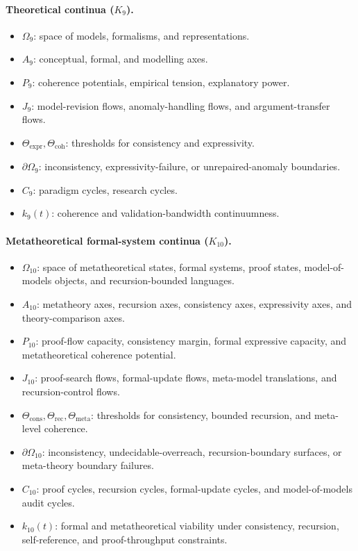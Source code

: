 \paragraph{Theoretical continua (\texorpdfstring{\(K_9\)}{K9}).}
\begin{itemize}
  \item \(\Omega_9\): space of models, formalisms, and representations.
  \item \(A_9\): conceptual, formal, and modelling axes.
  \item \(P_9\): coherence potentials, empirical tension, explanatory power.
  \item \(J_9\): model-revision flows, anomaly-handling flows, and
        argument-transfer flows.
  \item \(\Theta_{\mathrm{expr}}, \Theta_{\mathrm{coh}}\): thresholds for
        consistency and expressivity.
  \item \(\partial\Omega_9\): inconsistency, expressivity-failure, or
        unrepaired-anomaly boundaries.
  \item \(C_9\): paradigm cycles, research cycles.
  \item \(k_9(t)\): coherence and validation-bandwidth continuumness.
\end{itemize}

\paragraph{Metatheoretical formal-system continua (\texorpdfstring{\(K_{10}\)}{K10}).}
\begin{itemize}
  \item \(\Omega_{10}\): space of metatheoretical states, formal systems,
        proof states, model-of-models objects, and recursion-bounded
        languages.
  \item \(A_{10}\): metatheory axes, recursion axes, consistency axes,
        expressivity axes, and theory-comparison axes.
  \item \(P_{10}\): proof-flow capacity, consistency margin, formal
        expressive capacity, and metatheoretical coherence potential.
  \item \(J_{10}\): proof-search flows, formal-update flows,
        meta-model translations, and recursion-control flows.
  \item \(\Theta_{\mathrm{cons}}, \Theta_{\mathrm{rec}}, \Theta_{\mathrm{meta}}\):
        thresholds for consistency, bounded recursion, and meta-level
        coherence.
  \item \(\partial\Omega_{10}\): inconsistency, undecidable-overreach,
        recursion-boundary surfaces, or meta-theory boundary failures.
  \item \(C_{10}\): proof cycles, recursion cycles, formal-update cycles, and
        model-of-models audit cycles.
  \item \(k_{10}(t)\): formal and metatheoretical viability under consistency,
        recursion, self-reference, and proof-throughput constraints.
\end{itemize}

